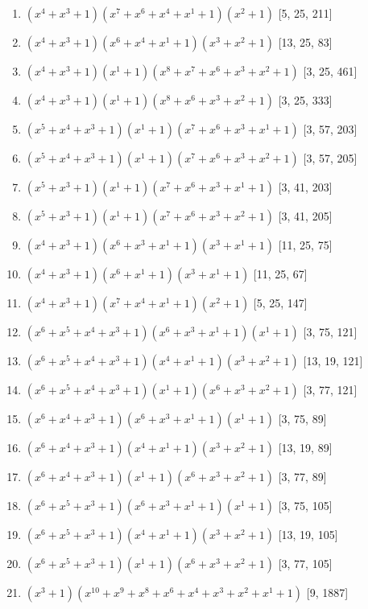 \documentclass[10pt,twocolumn]{article}
\begin{document}
\begin{enumerate}
\item $(x^{4} + x^{3} + 1)(x^{7} + x^{6} + x^{4} + x^{1} + 1)(x^{2} + 1)$  [5, 25, 211]
\item $(x^{4} + x^{3} + 1)(x^{6} + x^{4} + x^{1} + 1)(x^{3} + x^{2} + 1)$  [13, 25, 83]
\item $(x^{4} + x^{3} + 1)(x^{1} + 1)(x^{8} + x^{7} + x^{6} + x^{3} + x^{2} + 1)$  [3, 25, 461]
\item $(x^{4} + x^{3} + 1)(x^{1} + 1)(x^{8} + x^{6} + x^{3} + x^{2} + 1)$  [3, 25, 333]
\item $(x^{5} + x^{4} + x^{3} + 1)(x^{1} + 1)(x^{7} + x^{6} + x^{3} + x^{1} + 1)$  [3, 57, 203]
\item $(x^{5} + x^{4} + x^{3} + 1)(x^{1} + 1)(x^{7} + x^{6} + x^{3} + x^{2} + 1)$  [3, 57, 205]
\item $(x^{5} + x^{3} + 1)(x^{1} + 1)(x^{7} + x^{6} + x^{3} + x^{1} + 1)$  [3, 41, 203]
\item $(x^{5} + x^{3} + 1)(x^{1} + 1)(x^{7} + x^{6} + x^{3} + x^{2} + 1)$  [3, 41, 205]
\item $(x^{4} + x^{3} + 1)(x^{6} + x^{3} + x^{1} + 1)(x^{3} + x^{1} + 1)$  [11, 25, 75]
\item $(x^{4} + x^{3} + 1)(x^{6} + x^{1} + 1)(x^{3} + x^{1} + 1)$  [11, 25, 67]
\item $(x^{4} + x^{3} + 1)(x^{7} + x^{4} + x^{1} + 1)(x^{2} + 1)$  [5, 25, 147]
\item $(x^{6} + x^{5} + x^{4} + x^{3} + 1)(x^{6} + x^{3} + x^{1} + 1)(x^{1} + 1)$  [3, 75, 121]
\item $(x^{6} + x^{5} + x^{4} + x^{3} + 1)(x^{4} + x^{1} + 1)(x^{3} + x^{2} + 1)$  [13, 19, 121]
\item $(x^{6} + x^{5} + x^{4} + x^{3} + 1)(x^{1} + 1)(x^{6} + x^{3} + x^{2} + 1)$  [3, 77, 121]
\item $(x^{6} + x^{4} + x^{3} + 1)(x^{6} + x^{3} + x^{1} + 1)(x^{1} + 1)$  [3, 75, 89]
\item $(x^{6} + x^{4} + x^{3} + 1)(x^{4} + x^{1} + 1)(x^{3} + x^{2} + 1)$  [13, 19, 89]
\item $(x^{6} + x^{4} + x^{3} + 1)(x^{1} + 1)(x^{6} + x^{3} + x^{2} + 1)$  [3, 77, 89]
\item $(x^{6} + x^{5} + x^{3} + 1)(x^{6} + x^{3} + x^{1} + 1)(x^{1} + 1)$  [3, 75, 105]
\item $(x^{6} + x^{5} + x^{3} + 1)(x^{4} + x^{1} + 1)(x^{3} + x^{2} + 1)$  [13, 19, 105]
\item $(x^{6} + x^{5} + x^{3} + 1)(x^{1} + 1)(x^{6} + x^{3} + x^{2} + 1)$  [3, 77, 105]
\item $(x^{3} + 1)(x^{10} + x^{9} + x^{8} + x^{6} + x^{4} + x^{3} + x^{2} + x^{1} + 1)$  [9, 1887]

\end{enumerate}
\end{document}
